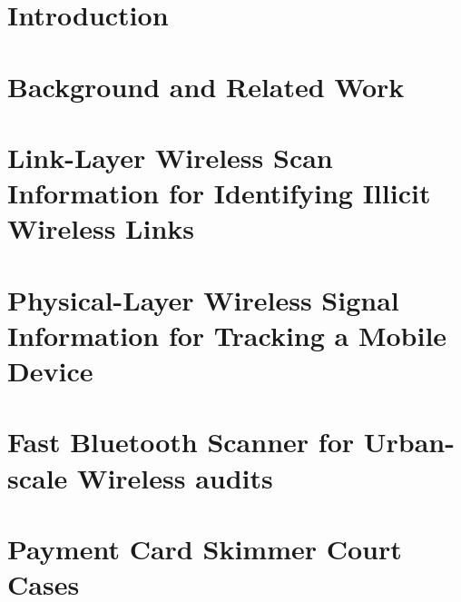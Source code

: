 \documentclass[12pt]{ucsddissertation}
\begin{document}
\frontmatter
\maketitle
\makecopyright
\makesignature



\tableofcontents
\listoffigures
\listoftables









\mainmatter

\chapter{Introduction}


\chapter{Background and Related Work}


\chapter{Link-Layer Wireless Scan Information for Identifying Illicit Wireless Links}


\chapter{Physical-Layer Wireless Signal Information for Tracking a Mobile Device}


\chapter{Fast Bluetooth Scanner for Urban-scale Wireless audits}


\appendix
\chapter{Payment Card Skimmer Court Cases}



\backmatter


\end{document}
